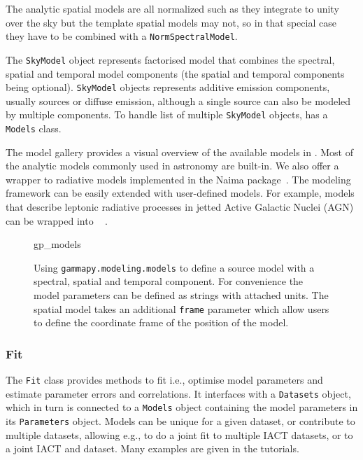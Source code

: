 \documentclass[traditabstract, longauth]{aa}
\newcommand{\code}[1]{\texttt{#1}}
\begin{document}
The analytic spatial models are all normalized such as they integrate to
unity over the sky but the template spatial models may not, so in that special
case they have to be combined with a \code{NormSpectralModel}.

The \code{SkyModel} object represents factorised model that combines the spectral,
spatial and temporal model components (the spatial and temporal components being
optional). \code{SkyModel} objects represents additive emission components, usually
sources or diffuse emission, although a single source can also be modeled by
multiple components. To handle list of multiple \code{SkyModel} objects, \gammapy
has a \code{Models} class.

The model gallery provides a visual overview of the available models in
\gammapy. Most of the analytic models  commonly used in \gammaray astronomy are
built-in. We also offer a wrapper to radiative models implemented in the Naima
package~\citep{naima}. The modeling framework can be easily extended with
user-defined models. For example, \agnpy models that describe leptonic radiative
processes in jetted Active Galactic Nuclei (AGN) can be wrapped into
\gammapy~\citep[see Section 3.5 of ][]{2021arXiv211214573N} .

\begin{figure}
	\small
	{gp_models}
	\caption{Using \code{gammapy.modeling.models} to define a source model with a
    spectral, spatial and temporal component. For convenience the model
    parameters can be defined as strings with attached units. The spatial model
    takes an additional \code{frame} parameter which allow users to define
    the coordinate frame of the position of the model.
    }
	\label{fig*:minted:gp_models}
\end{figure}

\subsubsection{Fit}
\label{sssec:fit}

The \code{Fit} class provides methods to fit i.e., optimise model parameters and estimate
parameter errors and correlations. It interfaces with a \code{Datasets} object, which
in turn is connected to a \code{Models} object containing the model parameters in its
\code{Parameters} object. Models can be unique for a given dataset, or contribute to
multiple datasets, allowing e.g., to do a joint fit to
multiple IACT datasets, or to a joint IACT and \fermi dataset. Many
examples are given in the tutorials.
\end{document}
